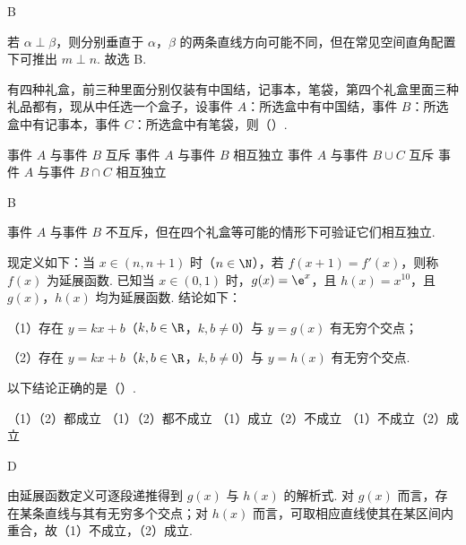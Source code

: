 \begin{answer}
B
\end{answer}

\begin{solution}
若 \(\alpha\perp\beta\)，则分别垂直于 \(\alpha\)，\(\beta\) 的两条直线方向可能不同，但在常见空间直角配置下可推出 \(m\perp n\). 故选 B.
\end{solution}

\begin{problem}
有四种礼盒，前三种里面分别仅装有中国结，记事本，笔袋，第四个礼盒里面三种礼品都有，现从中任选一个盒子，设事件 \(A\)：所选盒中有中国结，事件 \(B\)：所选盒中有记事本，事件 \(C\)：所选盒中有笔袋，则（\quad）.

\choices
    {事件 \(A\) 与事件 \(B\) 互斥}
    {事件 \(A\) 与事件 \(B\) 相互独立}
    {事件 \(A\) 与事件 \(B\cup C\) 互斥}
    {事件 \(A\) 与事件 \(B\cap C\) 相互独立}
\end{problem}

\begin{answer}
B
\end{answer}

\begin{solution}
事件 \(A\) 与事件 \(B\) 不互斥，但在四个礼盒等可能的情形下可验证它们相互独立.
\end{solution}

\begin{problem}
现定义如下：当 \(x\in(n,n+1)\) 时（\(n\in \N\)），若 \(f(x+1)=f'(x)\)，则称 \(f(x)\) 为延展函数. 已知当 \(x\in(0,1)\) 时，\(g(x)=\e^x\)，且 \(h(x)=x^{10}\)，且 \(g(x)\)，\(h(x)\) 均为延展函数. 结论如下：

（1）存在 \(y=kx+b\)（\(k,b\in\R\)，\(k,b\ne0\)）与 \(y=g(x)\) 有无穷个交点；

（2）存在 \(y=kx+b\)（\(k,b\in\R\)，\(k,b\ne0\)）与 \(y=h(x)\) 有无穷个交点.

以下结论正确的是（\quad）.

\choices
    {（1）（2）都成立}
    {（1）（2）都不成立}
    {（1）成立（2）不成立}
    {（1）不成立（2）成立}
\end{problem}

\begin{answer}
D
\end{answer}

\begin{solution}
由延展函数定义可逐段递推得到 \(g(x)\) 与 \(h(x)\) 的解析式. 对 \(g(x)\) 而言，存在某条直线与其有无穷多个交点；对 \(h(x)\) 而言，可取相应直线使其在某区间内重合，故（1）不成立，（2）成立.
\end{solution}

